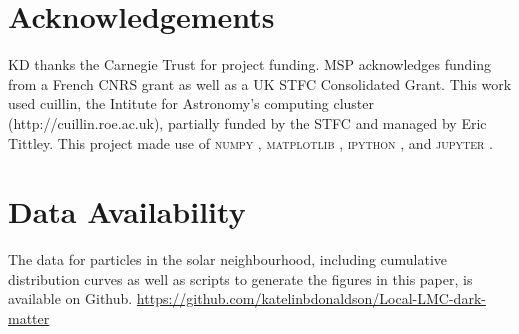 \documentclass[fleqn,usenatbib]{mnras}
\begin{document}
\section*{Acknowledgements}
KD thanks the Carnegie Trust for project funding. MSP  acknowledges funding from a French CNRS grant as well as a UK STFC Consolidated Grant. This work used cuillin, the Intitute for Astronomy's computing cluster (http://cuillin.roe.ac.uk), partially funded by the STFC and managed by Eric Tittley. This project made use of \textsc{numpy} \citep{numpy}, \textsc{matplotlib} \citep{matplotlib}, \textsc{ipython} \citep{ipython}, and \textsc{jupyter} \citep{jupyter}. 


\vspace{-0.6cm}
\section*{Data Availability}
The data for particles in the solar neighbourhood, including cumulative distribution curves as well as scripts to generate the figures in this paper, is available on Github. \url{https://github.com/katelinbdonaldson/Local-LMC-dark-matter}



%
% 



\bsp
\label{lastpage}
\end{document}
